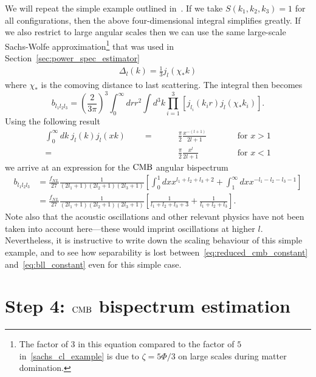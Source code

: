     We will repeat the simple example outlined in~\cite{FergShell_2}. If we
    take ${S(k_1,k_2,k_3)=1}$ for all configurations, then the above four-dimensional integral
    simplifies greatly. If we also restrict to large angular scales
    then we can use the same large-scale Sachs-Wolfe approximation\footnote{
    The factor of $3$ in this equation compared to the factor of $5$
    in~\eqref{sachs_cl_example} is due to $\zeta=5\Phi/3$
    on large scales during matter domination.
}
    that was used in Section~\ref{sec:power_spec_estimator}
    \begin{align}
        \Delta_l(k) = \frac{1}{3}j_l(\chi_*k)
    \end{align}
    where $\chi_*$ is the comoving distance to last scattering.
    The integral then becomes
    \begin{equation}
    \label{eq:reduced_cmb_constant}
    b_{l_1l_2l_3} = \left(\frac{2}{3\pi}\right)^3\int_{0}^{\infty}drr^2
        \int d^3k \prod_{i=1}^{3}\left[j_{l_i}(k_ir)j_l(\chi_*k_i)\right].
    \end{equation}
    Using the following result
    \begin{align}
        \int_0^\infty dk~j_l(k)j_l(xk)\qquad=\qquad&\frac{\pi}{2}\frac{x^{-(l+1)}}{2l+1}\qquad&&\text{for $x>1$}\\
                            =\qquad&\frac{\pi}{2}\frac{x^{l}}{2l+1}\qquad&&\text{for $x<1$}
    \end{align}
    we arrive at an expression for the $\text{CMB}$ angular bispectrum
    \begin{align} 
        b_{l_1l_2l_3} &= \frac{f_{NL}}{27}\frac{1}{(2l_1+1)(2l_2+1)(2l_3+1)}
        \left[\int^1_0dx x^{l_1+l_2+l_3+2}+\int^\infty_1dx x^{-l_1-l_2-l_3-1}\right]\label{eq:bll_constant_integral}\\
                &= \frac{f_{NL}}{27}\frac{1}{(2l_1+1)(2l_2+1)(2l_3+1)}
        \left[\frac{1}{l_1+l_2+l_3+3}+\frac{1}{l_1+l_2+l_3}\right]\label{eq:bll_constant}.
    \end{align}
    Note also that the acoustic oscillations and
    other relevant physics have not been taken
    into account here---these would imprint oscillations at higher $l$.
    Nevertheless, it is instructive to write down the scaling behaviour of this
    simple example, and to see how separability is lost between~\eqref{eq:reduced_cmb_constant}
    and~\eqref{eq:bll_constant} even for this simple case.


    \section{Step 4: $\text{CMB}$ bispectrum estimation}
